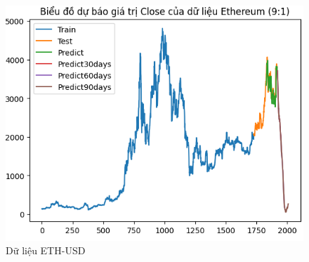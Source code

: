 \documentclass[conference]{IEEEtran}
\begin{document}
\begin{figure}[H]
\begin{minipage}{0.15\textwidth}
    \includegraphics[width=1\textwidth]{Figure/ETH91.png}
    \end{minipage}
    \caption{Dữ liệu ETH-USD}
    \label{fig:1}
\end{figure}
\end{document}
